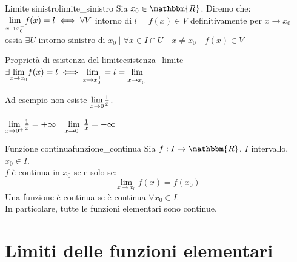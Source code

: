 \documentclass[12pt]{report}
\newcounter{definition}
\newcommand{\nmu}{}
\begin{document}
	\begin{definition}{\nmu Limite sinistro}{limite_sinistro}
		Sia $x_0 \in \mathbbm{R}$. Diremo che: \\
		$
		\mathlarger{\lim_{x \to x_0^-}}f(x) = l \iff \forall V$ intorno di $l$ $\quad f(x) \in V$ definitivamente per $x \to x_0^-$ \\
		ossia $\exists U\text{ intorno sinistro di $x_0$} \mid \forall x \in I \cap U \quad x \neq x_0 \quad f(x) \in V$
	\end{definition}
	\begin{note}{\nmu Proprietà di esistenza del limite}{esistenza_limite}
		$\exists \mathlarger{\lim_{x \to x_0}}f(x) =l \iff \mathlarger{\lim_{x \to x_0^+}}=l=\mathlarger{\lim_{x \to x_0^-}}$
	\end{note}
	Ad esempio non esiste $\mathlarger{\lim_{x \to 0}}\frac{1}{x}$.
	\begin{center}
	\end{center}

	$\mathlarger{\lim_{x \to0^+}}\frac{1}{x}= +\infty \quad \mathlarger{\lim_{x \to0^-}}\frac{1}{x}=-\infty$
	\begin{definition}{\nmu Funzione continua}{funzione_continua}
		Sia $f: I \to \mathbbm{R}$, $I$ intervallo, $x_0 \in I$. \\
		$f$ è continua in $x_0$ se e solo se:
		\[
		\lim_{x \to x_0}f(x)=f(x_0)
		\]
		Una funzione è continua se è continua $\forall x_0 \in I$. \\
		In particolare, tutte le funzioni elementari sono continue.
	\end{definition}
	\section{Limiti delle funzioni elementari}
\end{document}
